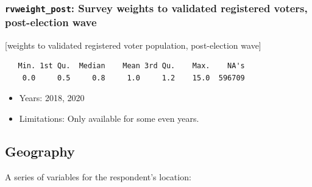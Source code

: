 \documentclass[10pt,article,oneside]{memoir}
\theoremstyle{definition}
\begin{document}
\subsubsection{\texorpdfstring{\texttt{rvweight\_post}: Survey weights
to validated registered voters, post-election
wave}{rvweight\_post: Survey weights to validated registered voters, post-election wave}}\label{rvweight_post-survey-weights-to-validated-registered-voters-post-election-wave}

{[}weights to validated registered voter population, post-election
wave{]}

\begin{verbatim}
   Min. 1st Qu.  Median    Mean 3rd Qu.    Max.    NA's 
    0.0     0.5     0.8     1.0     1.2    15.0  596709 
\end{verbatim}

\begin{itemize}
\tightlist
\item
  Years: 2018, 2020
\item
  Limitations: Only available for some even years.
\end{itemize}

\subsection{Geography}\label{geography}

A series of variables for the respondent's location:
\end{document}

